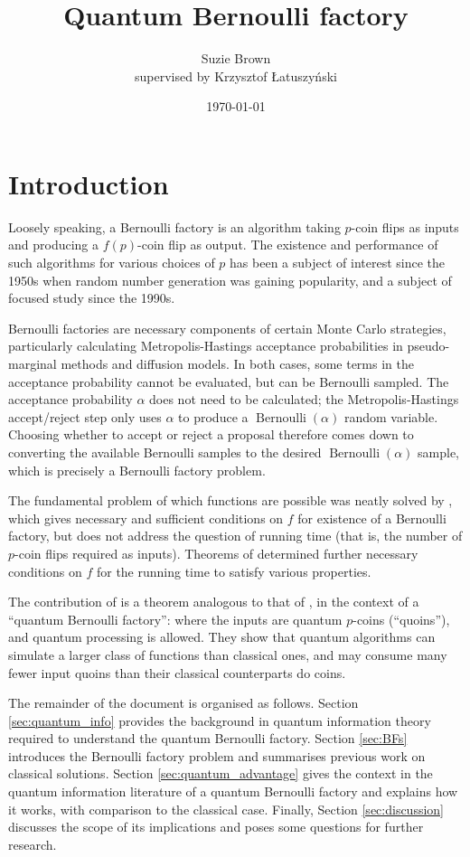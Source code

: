 \documentclass{article}
\title{Quantum Bernoulli factory}
\author{Suzie Brown \\ {\small supervised by Krzysztof \L atuszy\'nski}}
\date{\today}
\theoremstyle{definition}
\newcommand{\Bern}{\operatorname{Bernoulli}}
\begin{document}
\maketitle

\section{Introduction}
Loosely speaking, a Bernoulli factory is an algorithm taking $p$-coin flips as inputs and producing a $f(p)$-coin flip as output.
The existence and performance of such algorithms for various choices of $p$ has been a subject of interest since the 1950s when random number generation was gaining popularity, and a subject of focused study since the 1990s.

Bernoulli factories are necessary components of certain Monte Carlo strategies, particularly calculating Metropolis-Hastings acceptance probabilities in pseudo-marginal methods and diffusion models. 
In both cases, some terms in the acceptance probability cannot be evaluated, but can be Bernoulli sampled. The acceptance probability $\alpha$ does not need to be calculated; the Metropolis-Hastings accept/reject step only uses $\alpha$ to produce a $\Bern(\alpha)$ random variable. Choosing whether to accept or reject a proposal therefore comes down to converting the available Bernoulli samples to the desired $\Bern(\alpha)$ sample, which is precisely a Bernoulli factory problem.

The fundamental problem of which functions are possible was neatly solved by \citet{keane1994}, which gives necessary and sufficient conditions on $f$ for existence of a Bernoulli factory, but does not address the question of running time (that is, the number of $p$-coin flips required as inputs).
Theorems of \citet{nacu2005} determined further necessary conditions on $f$ for the running time to satisfy various properties.

The contribution of \citet{dale2015} is a theorem analogous to that of \citet{keane1994}, in the context of a ``quantum Bernoulli factory'': where the inputs are quantum $p$-coins (``quoins''), and quantum processing is allowed.
They show that quantum algorithms can simulate a larger class of functions than classical ones, and may consume many fewer input quoins than their classical counterparts do coins.


The remainder of the document is organised as follows.
Section \ref{sec:quantum_info} provides the background in quantum information theory required to understand the quantum Bernoulli factory. 
Section \ref{sec:BFs} introduces the Bernoulli factory problem and summarises previous work on classical solutions.
Section \ref{sec:quantum_advantage} gives the context in the quantum information literature of a quantum Bernoulli factory and explains how it works, with comparison to the classical case.
Finally, Section \ref{sec:discussion} discusses the scope of its implications and poses some questions for further research.
\end{document}
